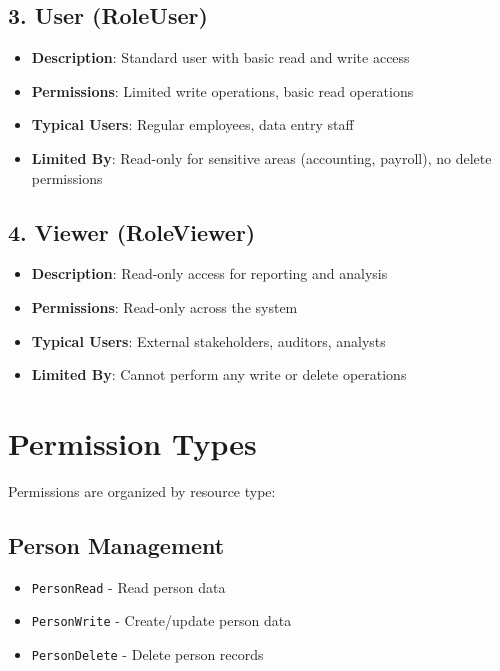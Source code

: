 \subsection{\texorpdfstring{3. \textbf{User
(RoleUser)}}{3. User (RoleUser)}}\label{user-roleuser}

\begin{itemize}
\tightlist
\item
  \textbf{Description}: Standard user with basic read and write access
\item
  \textbf{Permissions}: Limited write operations, basic read operations
\item
  \textbf{Typical Users}: Regular employees, data entry staff
\item
  \textbf{Limited By}: Read-only for sensitive areas (accounting,
  payroll), no delete permissions
\end{itemize}

\subsection{\texorpdfstring{4. \textbf{Viewer
(RoleViewer)}}{4. Viewer (RoleViewer)}}\label{viewer-roleviewer}

\begin{itemize}
\tightlist
\item
  \textbf{Description}: Read-only access for reporting and analysis
\item
  \textbf{Permissions}: Read-only across the system
\item
  \textbf{Typical Users}: External stakeholders, auditors, analysts
\item
  \textbf{Limited By}: Cannot perform any write or delete operations
\end{itemize}

\section{Permission Types}\label{permission-types}

Permissions are organized by resource type:

\subsection{Person Management}\label{person-management}

\begin{itemize}
\tightlist
\item
  \texttt{PersonRead} - Read person data
\item
  \texttt{PersonWrite} - Create/update person data
\item
  \texttt{PersonDelete} - Delete person records
\end{itemize}

